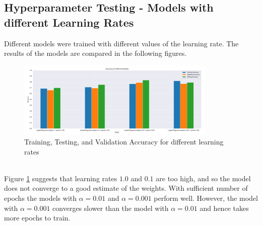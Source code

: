 \documentclass[12pt]{article}
\begin{document}
    \subsection*{Hyperparameter Testing - Models with different Learning Rates}
    Different models were trained with different values of the learning rate. The results of the models are compared in the
    following figures.
    \begin{figure}[h]
        \centering
        \includegraphics[width=0.85\textwidth]{./../Assets/accuracy.png}
        \caption{Training, Testing, and Validation Accuracy for different learning rates}
        \label{fig:accuracy}
    \end{figure}
    \vspace*{5pt} \\
    Figure \ref{fig:accuracy} suggests that learning rates $1.0$ and $0.1$ are too high, and so the model does not converge
    to a good estimate of the weights. With sufficient number of epochs the models with $\alpha = 0.01$ and $\alpha = 0.001$
    perform well. However, the model with $\alpha = 0.001$ converges slower than the model with $\alpha = 0.01$ and
    hence takes more epochs to train.
\end{document}
